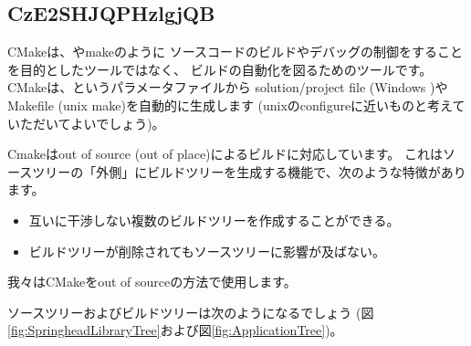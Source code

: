 \subsection{CzE2SHJQPHzlgjQB}
\label{subsec:WhenUsedCMake}

\noindent
CMake\KLUDGE は、\VS \KLUDGE やmake\KLUDGE のように
\KLUDGE ソースコードのビルドやデバッグの制御をすることを目的としたツールではなく、
\KLUDGE ビルドの自動化を図るためのツールです。
CMake\KLUDGE は、\CMakeLists{}\KLUDGE というパラメータファイルから
solution/project file (Windows \VS)\KLUDGE やMakefile (unix make)\KLUDGE を自動的に生成します
(unix\KLUDGE のconfigure\KLUDGE に近いものと考えていただいてよいでしょう)\KLUDGE 。

\medskip
\noindent
Cmake\KLUDGE はout of source (out of place)\KLUDGE によるビルドに対応しています。
\KLUDGE これはソースツリーの「外側」にビルドツリーを生成する機能で、次のような特徴があります。
\begin{itemize}
  \item	\KLUDGE 互いに干渉しない複数のビルドツリーを作成することができる。
  \item	\KLUDGE ビルドツリーが削除されてもソースツリーに影響が及ばない。
\end{itemize}
\KLUDGE 我々はCMake\KLUDGE をout of source\KLUDGE の方法で使用します。

\medskip
\noindent
\KLUDGE ソースツリーおよびビルドツリーは次のようになるでしょう
(\KLUDGE 図\ref{fig:SpringheadLibraryTree}\KLUDGE および図\ref{fig:ApplicationTree})\KLUDGE 。

